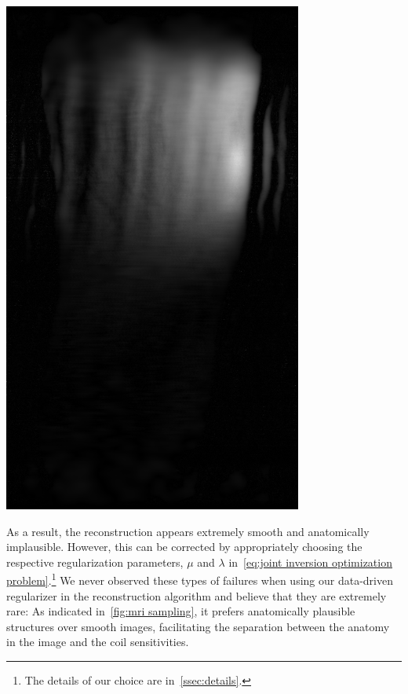 \begin{sidefigure}
	\includegraphics[width=.45\marginparwidth]{failure/coil_ims_01}
	\caption[Coil sensitivities in a failure case of the proposed algorithm]{%
		Under-smoothed coil sensitivities for the failure case of our algorithm in the third row and the second column of~\cref{fig:parallel imaging id}.%
	}%
	\label{fig:failure case coil sensitivities}
\end{sidefigure}
As a result, the reconstruction appears extremely smooth and anatomically implausible.
However, this can be corrected by appropriately choosing the respective regularization parameters, \( \mu \) and \( \lambda \) in~\cref{eq:joint inversion optimization problem}.\footnote{The details of our choice are in~\cref{ssec:details}.}
We never observed these types of failures when using our data-driven regularizer in the reconstruction algorithm and believe that they are extremely rare:
As indicated in~\cref{fig:mri sampling}, it prefers anatomically plausible structures over smooth images, facilitating the separation between the anatomy in the image and the coil sensitivities.

